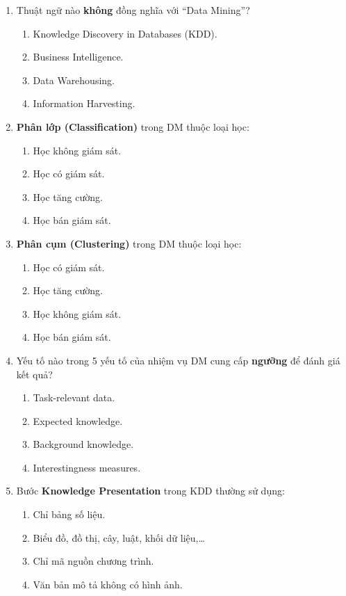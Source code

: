 \documentclass[10pt]{article}
\begin{document}
\begin{enumerate}[leftmargin=*, label=\textbf{Câu \arabic*.}]
    \item Thuật ngữ nào \textbf{không} đồng nghĩa với ``Data Mining''?
    \begin{enumerate}[label=\Alph*.]
        \item Knowledge Discovery in Databases (KDD).
        \item Business Intelligence.
        \item Data Warehousing.
        \item Information Harvesting.
    \end{enumerate}

    \item \textbf{Phân lớp (Classification)} trong DM thuộc loại học:
    \begin{enumerate}[label=\Alph*.]
        \item Học không giám sát.
        \item Học có giám sát.
        \item Học tăng cường.
        \item Học bán giám sát.
    \end{enumerate}

    \item \textbf{Phân cụm (Clustering)} trong DM thuộc loại học:
    \begin{enumerate}[label=\Alph*.]
        \item Học có giám sát.
        \item Học tăng cường.
        \item Học không giám sát.
        \item Học bán giám sát.
    \end{enumerate}

    \item Yếu tố nào trong 5 yếu tố của nhiệm vụ DM cung cấp \textbf{ngưỡng} để đánh giá kết quả?
    \begin{enumerate}[label=\Alph*.]
        \item Task-relevant data.
        \item Expected knowledge.
        \item Background knowledge.
        \item Interestingness measures.
    \end{enumerate}

    \item Bước \textbf{Knowledge Presentation} trong KDD thường sử dụng:
    \begin{enumerate}[label=\Alph*.]
        \item Chỉ bảng số liệu.
        \item Biểu đồ, đồ thị, cây, luật, khối dữ liệu,\ldots
        \item Chỉ mã nguồn chương trình.
        \item Văn bản mô tả không có hình ảnh.
    \end{enumerate}


\end{enumerate}
\end{document}
